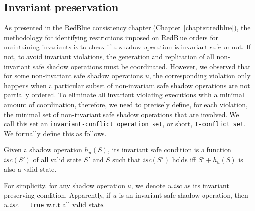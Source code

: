 \subsection{Invariant preservation}
\label{sec:properties:inv}
As presented in the RedBlue consistency chapter (Chapter~\ref{chapter:redblue}), the methodology
for identifying restrictions imposed on RedBlue orders for maintaining invariants is to check if
a shadow operation is invariant safe or not. If not, to avoid invariant 
violations, the generation and replication of all non-invariant safe shadow operations must be coordinated. 
However, we observed that for some non-invariant safe shadow operations $u$, the corresponding violation
only happens when a particular subset of non-invariant safe shadow operations are not partially ordered. 
To eliminate all invariant violating executions with a minimal amount of coordination, therefore, 
we need to precisely define, for each violation, the minimal
set of non-invariant safe shadow operations that are involved. We call this
set an {\tt invariant-conflict operation set}, or short, {\tt I-conflict set}. We formally define this 
as follows.

\begin{mydef}
 Given a shadow operation $h_{u}(S)$, its invariant safe
condition is a function $isc(S')$ of all valid state $S'$ and $S$ such that $isc(S')$ holds iff
$S' + h_{u}(S)$ is also a valid state. 
\label{def:isafecond}
\end{mydef}

For simplicity, for any shadow operation $u$, we denote $u.isc$ as its invariant preserving condition. Apparently,
if $u$ is an invariant safe shadow operation, then $u.isc = $ {\tt true} w.r.t all valid state.
\fi
{}


